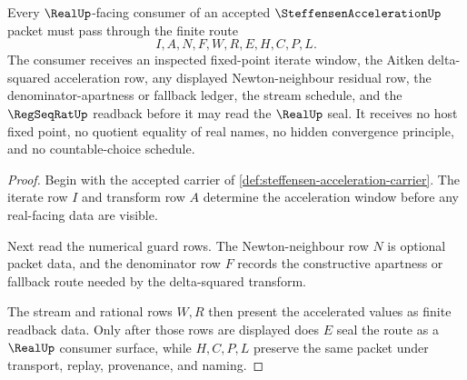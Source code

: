 \begin{theorem}
\label{thm:steffensen-acceleration-real-seal-route}
Every $\RealUp$-facing consumer of an accepted $\SteffensenAccelerationUp$ packet must pass through the finite route
$$
I,A,N,F,W,R,E,H,C,P,L .
$$
The consumer receives an inspected fixed-point iterate window, the Aitken delta-squared acceleration row, any displayed Newton-neighbour residual row, the denominator-apartness or fallback ledger, the stream schedule, and the $\RegSeqRatUp$ readback before it may read the $\RealUp$ seal. It receives no host fixed point, no quotient equality of real names, no hidden convergence principle, and no countable-choice schedule.
\end{theorem}
\begin{proof}
Begin with the accepted carrier of \autoref{def:steffensen-acceleration-carrier}. The iterate row $I$ and transform row $A$ determine the acceleration window before any real-facing data are visible.

Next read the numerical guard rows. The Newton-neighbour row $N$ is optional packet data, and the denominator row $F$ records the constructive apartness or fallback route needed by the delta-squared transform.

The stream and rational rows $W,R$ then present the accelerated values as finite readback data. Only after those rows are displayed does $E$ seal the route as a $\RealUp$ consumer surface, while $H,C,P,L$ preserve the same packet under transport, replay, provenance, and naming.
\end{proof}


\begin{closurestatus}{\SteffensenAccelerationUp}
  \theoryclosure{\seedClosure}
  \formalstatus{\unformalizedV}
\end{closurestatus}
